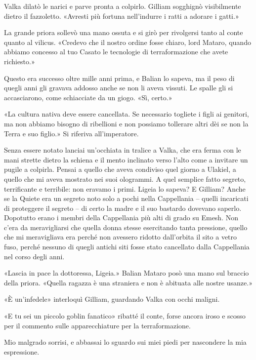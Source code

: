 Valka dilatò le narici e parve pronta a colpirlo. Gilliam sogghignò
visibilmente dietro il fazzoletto. «Avresti più fortuna nell'indurre i
ratti a adorare i gatti.»

La grande priora sollevò una mano ossuta e si girò per rivolgersi tanto
al conte quanto al vilicus. «Credevo che il nostro ordine fosse chiaro,
lord Mataro, quando abbiamo concesso al tuo Casato le tecnologie di
terraformazione che avete richiesto.»

Questo era successo oltre mille anni prima, e Balian lo sapeva, ma il
peso di quegli anni gli gravava addosso anche se non li aveva vissuti.
Le spalle gli si accasciarono, come schiacciate da un giogo. «Sì,
certo.»

«La cultura nativa deve essere cancellata. Se necessario togliete i
figli ai genitori, ma non abbiamo bisogno di ribellioni e non possiamo
tollerare altri dèi se non la Terra e suo figlio.» Si riferiva
all'imperatore.

Senza essere notato lanciai un'occhiata in tralice a Valka, che era
ferma con le mani strette dietro la schiena e il mento inclinato verso
l'alto come a invitare un pugile a colpirla. Pensai a quello che aveva
condiviso quel giorno a Ulakiel, a quello che mi aveva mostrato nei suoi
ologrammi. A quel semplice fatto segreto, terrificante e terribile: non
eravamo i primi. Ligeia lo sapeva? E Gilliam? Anche se la Quiete era un
segreto noto solo a pochi nella Cappellania -- quelli incaricati di
proteggere il segreto -- di certo la madre e il suo bastardo dovevano
saperlo. Dopotutto erano i membri della Cappellania più alti di grado su
Emesh. Non c'era da meravigliarsi che quella donna stesse esercitando
tanta pressione, quello che mi meravigliava era perché non avessero
ridotto dall'orbita il sito a vetro fuso, perché nessuno di quegli
antichi siti fosse stato cancellato dalla Cappellania nel corso degli
anni.

«Lascia in pace la dottoressa, Ligeia.» Balian Mataro posò una mano sul
braccio della priora. «Quella ragazza è una straniera e non è abituata
alle nostre usanze.»

«È un'infedele» interloquì Gilliam, guardando Valka con occhi maligni.

«E tu sei un piccolo goblin fanatico» ribatté il conte, forse ancora
iroso e scosso per il commento sulle apparecchiature per la
terraformazione.

Mio malgrado sorrisi, e abbassai lo sguardo sui miei piedi per
nascondere la mia espressione.

